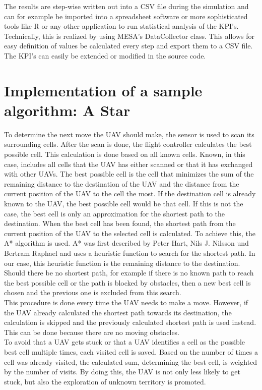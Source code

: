 The results are step-wise written out into a CSV file during the simulation and can for example be imported into a spreadsheet software or more sophisticated tools like R or any other application to run statistical analysis of the KPI's. Technically, this is realized by using MESA's DataCollector class. This allows for easy definition of values be calculated every step and export them to a CSV file. The KPI's can easily be extended or modified in the source code.

\section{Implementation of a sample algorithm: A Star}\label{sec:algorithm}
To determine the next move the UAV should make, the sensor is used to scan its surrounding cells. After the scan is done, the flight controller calculates the best possible cell. This calculation is done based on all known cells. Known, in this case, includes all cells that the UAV has either scanned or that it has exchanged with other UAVs. The best possible cell is the cell that minimizes the sum of the remaining distance to the destination of the UAV and the distance from the current position of the UAV to the cell the most. If the destination cell is already known to the UAV, the best possible cell would be that cell. If this is not the case, the best cell is only an approximation for the shortest path to the destination. When the best cell has been found, the shortest path from the current position of the UAV to the selected cell is calculated. To achieve this, the A* algorithm is used. A* was first described by Peter Hart, Nils J. Nilsson und Bertram Raphael \cite{hart.1968} and uses a heuristic function to search for the shortest path. In our case, this heuristic function is the remaining distance to the destination. Should there be no shortest path, for example if there is no known path to reach the best possible cell or the path is blocked by obstacles, then a new best cell is chosen and the previous one is excluded from this search.\\
This procedure is done every time the UAV needs to make a move. However, if the UAV already calculated the shortest path towards its destination, the calculation is skipped and the previously calculated shortest path is used instead. This can be done because there are no moving obstacles.\\
To avoid that a UAV gets stuck or that a UAV identifies a cell as the possible best cell multiple times, each visited cell is saved. Based on the number of times a cell was already visited, the calculated sum, determining the best cell, is weighted by the number of visits. By doing this, the UAV is not only less likely to get stuck, but also the exploration of unknown territory is promoted.

